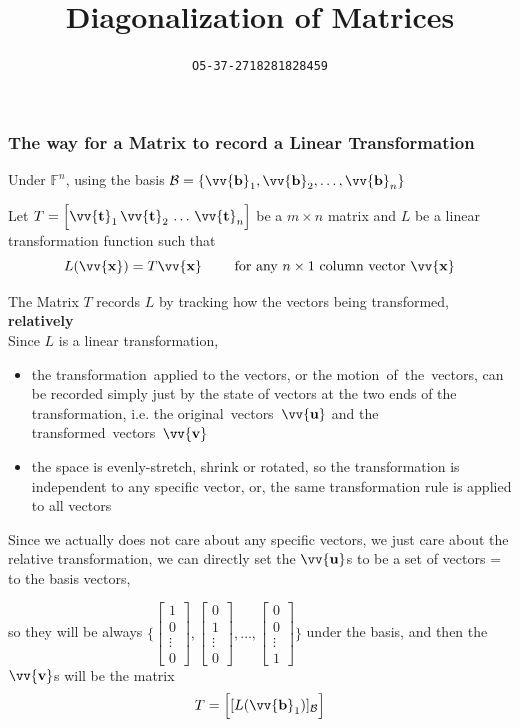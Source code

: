 \documentclass[11pt]{article}
\title{Diagonalization of Matrices}
\author{\texttt{O5-37-2718281828459}}
\DeclareRobustCommand{\myvec}[1]{\vv{\mathbf{#1}}}
\newcommand{\myset}[1]{\mathcal{#1}}
\newcommand{\mymat}[1]{#1}
\begin{document}
    \subsubsection{The way for a Matrix to record a Linear Transformation}
    Under $\mathbb{F}^n$, using the basis $\myset{B} = \{ \myvec{b}_1, \myvec{b}_2, \dots, \myvec{b}_n \}$ \vspace{1ex}

    Let $T = \Big[ \myvec{t}_1\,\myvec{t}_2\,\dots\,\myvec{t}_n \Big]$ be a $m \times n$ matrix and $L$ be a linear transformation function such that
    \[ \mymat{L}(\myvec{x}) = \mymat{T}\myvec{x} \qquad \text{ for any }n \times 1\text{ column vector }\myvec{x} \]
    
    The Matrix $\mymat{T}$ records $\mymat{L}$ by tracking how the vectors being transformed, \textbf{relatively} \\
    Since $\mymat{L}$ is a linear transformation, \\
    \begin{itemize}
        \item the transformation~applied to the vectors, or the motion~of~the~vectors, can be recorded simply just by the state of vectors at the two ends of the transformation, i.e. the original~vectors~$\myvec{u}$ and the transformed~vectors~$\myvec{v}$
        \item the space is evenly-stretch, shrink or rotated, so the transformation is independent to any specific vector, or, the same transformation rule is applied to all vectors
    \end{itemize} 
    Since we actually does not care about any specific vectors, we just care about the relative transformation, we can directly set the $\myvec{u}$s to be a set of vectors = to the basis vectors, \vspace{1ex}

    so they will be always $\{
        \begin{bmatrix} 1 \\ 0 \\ \vdots \\ 0 \end{bmatrix}, 
        \begin{bmatrix} 0 \\ 1 \\ \vdots \\ 0 \end{bmatrix}, 
        \dots, 
        \begin{bmatrix} 0 \\ 0 \\ \vdots \\ 1 \end{bmatrix} 
    \}$ under the basis, and then the $\myvec{v}$s will be the matrix 
    \begin{equation}
        \mymat{T} = \Big[ [\mymat{L}(\myvec{b}_1)]_{\myset{B}} \Big]
    \end{equation}
    
\end{document}
